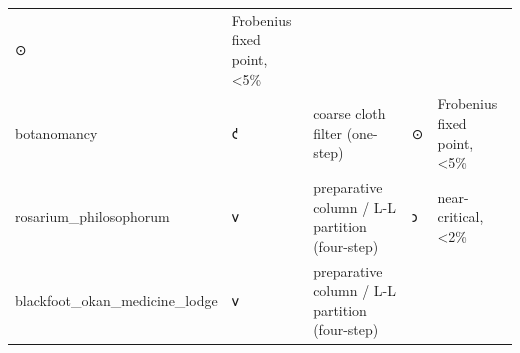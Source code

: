 \documentclass[12pt,a4paper]{article}
\begin{document}
\begin{longtable}[]{@{}lllll@{}}
\begin{minipage}[t]{0.17\columnwidth}
⊙\strut
\end{minipage} & \begin{minipage}[t]{0.17\columnwidth}\raggedright
Frobenius fixed point, \textless5\%\strut
\end{minipage}\tabularnewline
\begin{minipage}[t]{0.17\columnwidth}\raggedright
botanomancy\strut
\end{minipage} & \begin{minipage}[t]{0.17\columnwidth}\raggedright
𐑒\strut
\end{minipage} & \begin{minipage}[t]{0.17\columnwidth}\raggedright
coarse cloth filter (one-step)\strut
\end{minipage} & \begin{minipage}[t]{0.17\columnwidth}\raggedright
⊙\strut
\end{minipage} & \begin{minipage}[t]{0.17\columnwidth}\raggedright
Frobenius fixed point, \textless5\%\strut
\end{minipage}\tabularnewline
\begin{minipage}[t]{0.17\columnwidth}\raggedright
rosarium\_philosophorum\strut
\end{minipage} & \begin{minipage}[t]{0.17\columnwidth}\raggedright
𐑫\strut
\end{minipage} & \begin{minipage}[t]{0.17\columnwidth}\raggedright
preparative column / L-L partition (four-step)\strut
\end{minipage} & \begin{minipage}[t]{0.17\columnwidth}\raggedright
𐑮\strut
\end{minipage} & \begin{minipage}[t]{0.17\columnwidth}\raggedright
near-critical, \textless2\%\strut
\end{minipage}\tabularnewline
\begin{minipage}[t]{0.17\columnwidth}\raggedright
blackfoot\_okan\_medicine\_lodge\strut
\end{minipage} & \begin{minipage}[t]{0.17\columnwidth}\raggedright
𐑫\strut
\end{minipage} & \begin{minipage}[t]{0.17\columnwidth}\raggedright
preparative column / L-L partition (four-step)\strut
\end{minipage} & \begin{minipage}[t]{0.17\columnwidth}\raggedright

\end{minipage}
\end{longtable}
\end{document}
